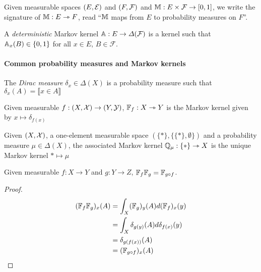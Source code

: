 \begin{notation}
Given measurable spaces $(E,\mathcal{E})$ and $(F,\mathcal{F})$ and $\mathbb{M}:E\times\mathcal{F}\to [0,1]$, we write the signature of $\mathbb{M}:E\rightarrowtriangle F$, read ``$\mathbb{M}$ maps from $E$ to probability measures on $F$''.
\end{notation}

\begin{definition}
A \emph{deterministic} Markov kernel $\mathbb{A}:E\to \Delta(\mathcal{F})$ is a kernel such that $\mathbb{A}_x(B)\in\{0,1\}$ for all $x\in E$, $B\in\mathcal{F}$.
\end{definition}

\paragraph{Common probability measures and Markov kernels}

\begin{definition}\label{def:dirac_meas}
The \emph{Dirac measure} $\delta_x\in \Delta(X)$ is a probability measure such that $\delta_x(A)=\llbracket x\in A \rrbracket$
\end{definition}

\begin{definition}\label{def:mkern_func}
Given measurable $f:(X,\mathcal{X})\to (Y,\mathcal{Y})$, $\mathbb{F}_f:X\rightarrowtriangle Y$ is the Markov kernel given by $x\mapsto \delta_{f(x)}$
\end{definition}

\begin{definition}
Given $(X,\mathcal{X})$, a one-element measurable space $(\{*\},\{\{*\},\emptyset\})$ and a probability measure $\mu\in \Delta(X)$, the associated Markov kernel $\mathbb{Q}_\mu:\{*\}\rightarrowtriangle X$ is the unique Markov kernel $*\mapsto \mu$
\end{definition}

\begin{lemma}\label{lem:func_kern_product}
Given measurable $f:X\to Y$ and $g:Y\to Z$, $\mathbb{F}_f\mathbb{F}_g = \mathbb{F}_{g\circ f}$.
\end{lemma}

\begin{proof}
\begin{align}
    (\mathbb{F}_{f}\mathbb{F}_g)_x(A) &= \int_X (\mathbb{F}_g)_y(A) d(\mathbb{F}_f)_x(y)\\
                                      &= \int_X \delta_{g(y)}(A) d\delta_{f(x)}(y)\\
                                      &= \delta_{g(f(x))} (A)\\
                                      &= (\mathbb{F}_{g\circ f})_x(A) 
\end{align}
\end{proof}


